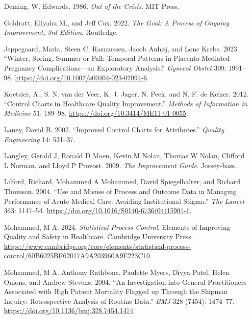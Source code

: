 \documentclass[
]{book}
\newlength{\cslhangindent}
\newenvironment{CSLReferences}[2] %
 {\begin{list}{}{%
  \setlength{\itemindent}{0pt}
  \setlength{\leftmargin}{0pt}
  \setlength{\parsep}{0pt}
  \ifodd #1
   \setlength{\leftmargin}{\cslhangindent}
   \setlength{\itemindent}{-1\cslhangindent}
  \fi
  \setlength{\itemsep}{#2\baselineskip}}}
 {\end{list}}
\begin{document}
\begin{CSLReferences}{1}{1}
Deming, W. Edwards. 1986. \emph{Out of the Crisis}. MIT Press.

Goldratt, Eliyahu M., and Jeff Cox. 2022. \emph{The Goal: A Process of Ongoing Improvement, 3rd Edition}. Routledge.

Jeppegaard, Maria, Steen C. Rasmussen, Jacob Anhøj, and Lone Krebs. 2023. {``Winter, Spring, Summer or Fall: Temporal Patterns in Placenta-Mediated Pregnancy Complications---an Exploratory Analysis.''} \emph{Gynecol Obstet} 309: 1991--98. \url{https://doi.org/10.1007/s00404-023-07094-6}.

Koetsier, A., S. N. van der Veer, K. J. Jager, N. Peek, and N. F. de Keizer. 2012. {``Control Charts in Healthcare Quality Improvement.''} \emph{Methods of Information in Medicine} 51: 189--98. \url{https://doi.org/10.3414/ME11-01-0055}.

Laney, David B. 2002. {``Improved Control Charts for Attributes.''} \emph{Quality Engineering} 14: 531--37.

Langley, Gerald J, Ronald D Moen, Kevin M Nolan, Thomas W Nolan, Clifford L Norman, and Lloyd P Provost. 2009. \emph{The Improvement Guide}. Jossey-bass.

Lilford, Richard, Mohammed A Mohammed, David Spiegelhalter, and Richard Thomson. 2004. {``Use and Misuse of Process and Outcome Data in Managing Performance of Acute Medical Care: Avoiding Institutional Stigma.''} \emph{The Lancet} 363: 1147--54. \url{https://doi.org/10.1016/S0140-6736(04)15901-1}.

Mohammed, M A. 2024. \emph{Statistical Process Control}. Elements of Improving Quality and Safety in Healthcare. Cambridge University Press. \url{https://www.cambridge.org/core/elements/statistical-process-control/60B6025BF62017A9A203960A9E223C10}.

Mohammed, M A, Anthony Rathbone, Paulette Myers, Divya Patel, Helen Onions, and Andrew Stevens. 2004. {``An Investigation into General Practitioners Associated with High Patient Mortality Flagged up Through the Shipman Inquiry: Retrospective Analysis of Routine Data.''} \emph{BMJ} 328 (7454): 1474--77. \url{https://doi.org/10.1136/bmj.328.7454.1474}.


\end{CSLReferences}
\end{document}
